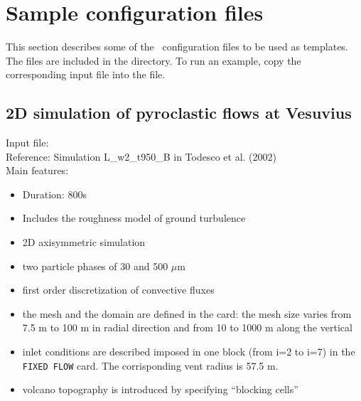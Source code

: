 \section{Sample configuration files}
\label{section:input_sample}
This section describes some of the \PDAC\ configuration files to be used
as templates. The files are included in the  directory.
To run an example, copy the corresponding input file into the 
 file.
\prettypar
%
\subsection{2D simulation of pyroclastic flows at Vesuvius}
Input file: \\
Reference: Simulation L\_w2\_t950\_B in Todesco et al. (2002)\\
Main features:
\begin{itemize}
\item Duration: 800s
\item Includes the roughness model of ground turbulence
\item 2D axisymmetric simulation
\item two particle phases of 30 and 500 $\mu$m
\item first order discretization of convective fluxes
\item the mesh and the domain are defined in the  card: the
      mesh size varies from 7.5 m to 100 m in radial direction and from 10 to
      1000 m along the vertical
\item inlet conditions are described imposed in one block (from i=2 to i=7)
      in the {\tt FIXED FLOW} card. The corrisponding vent radius is 57.5 m.
\item volcano topography is introduced by specifying ``blocking cells''
\end{itemize}
%
\newpage
